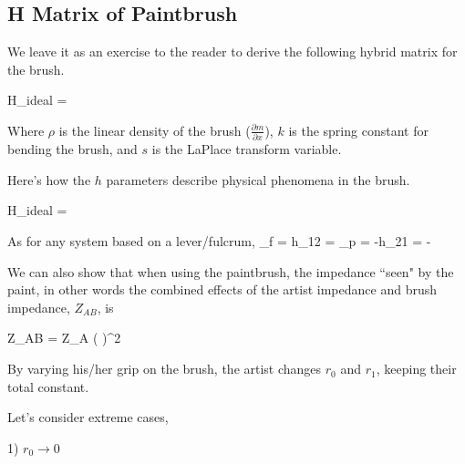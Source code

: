 
\subsection{H Matrix of Paintbrush}

We leave it as an exercise to the reader to derive the following hybrid matrix for the brush.

\bq\label{HBrush}
H_{ideal}  = 
\eq

Where $\rho$  is the linear density of the brush ($\frac{\partial m}{\partial x}$),
$k$ is the spring constant for bending the brush, and $s$ is the LaPlace transform variable.


Here's how the $h$ parameters describe physical phenomena in the brush.

\bq\label{HBrush2}
H_{ideal}  = 
\eq

As for any system based on a lever/fulcrum,
\bq
\lambda_f =  h_{12} =  \qquad
\lambda_p = -h_{21} = -
\eq

We can also show that when using the paintbrush, the impedance ``seen" by the paint, in other words the combined effects of the artist impedance and brush impedance, $Z_{AB}$, is

\bq
Z_{AB} = Z_A \left(  \right)^2
\eq

By varying his/her grip on the brush, the artist changes $r_0$ and $r_1$, keeping their total constant.

Let's consider extreme cases,

1)  $r_0 \rightarrow 0$

